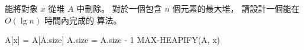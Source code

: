 \startEXERCISE
{} 能將對象 $x$ 從堆 $A$ 中刪除。
對於一個包含 $n$ 個元素的最大堆，
請設計一個能在 $O(\lg{n})$ 時間內完成的  算法。
\stopEXERCISE

\startANSWER
{}
\startCLRSCODE
A[x] = A[A.size]
A.size = A.size - 1
MAX-HEAPIFY(A, x)
\stopCLRSCODE
\stopANSWER
